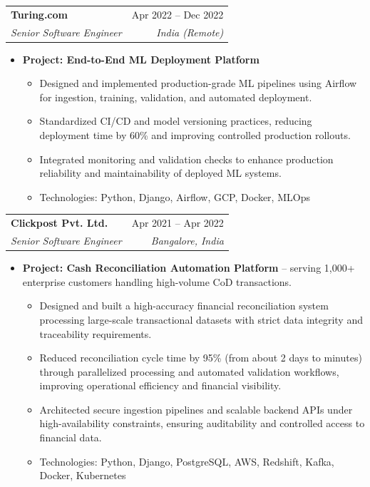 \documentclass[letterpaper,10pt]{article}
\makeatletter
\newcommand{\resumeItem}[1]{\item\small{#1}}
\newcommand{\resumeSubheading}[4]{
\vspace{-1pt}\item
  \begin{tabular*}{0.97\textwidth}[t]{l@{\extracolsep{\fill}}r}
    \textbf{#1} & #2 \\
    \textit{#3} & \textit{#4} \\
  \end{tabular*}\vspace{-7pt}
}
\newcommand{\resumeSubHeadingList}{\begin{itemize}[leftmargin=0.15in, label={}]}
\newcommand{\resumeSubHeadingListEnd}{\end{itemize}}
\makeatother
\begin{document}
  \resumeSubheading
      {Turing.com}{Apr 2022 -- Dec 2022}
      {Senior Software Engineer}{India (Remote)}
      \resumeSubHeadingList
          \resumeItem{\textbf{Project: End-to-End ML Deployment Platform}}
          \begin{itemize}[leftmargin=1.4em,label=•]
              \item \small{Designed and implemented production-grade ML pipelines using Airflow for ingestion, training, validation, and automated deployment.}
              \item \small{Standardized CI/CD and model versioning practices, reducing deployment time by 60\% and improving controlled production rollouts.}
              \item \small{Integrated monitoring and validation checks to enhance production reliability and maintainability of deployed ML systems.}
              \item \small{Technologies: Python, Django, Airflow, GCP, Docker, MLOps}
          \end{itemize}
      \resumeSubHeadingListEnd

  \resumeSubheading
      {Clickpost Pvt. Ltd.}{Apr 2021 -- Apr 2022}
      {Senior Software Engineer}{Bangalore, India}
      \resumeSubHeadingList
          \resumeItem{\textbf{Project: Cash Reconciliation Automation Platform} -- serving 1,000+ enterprise customers handling high-volume CoD transactions.}
          \begin{itemize}[leftmargin=1.4em,label=•]
              \item \small{Designed and built a high-accuracy financial reconciliation system processing large-scale transactional datasets with strict data integrity and traceability requirements.}
              \item \small{Reduced reconciliation cycle time by 95\% (from about 2 days to minutes) through parallelized processing and automated validation workflows, improving operational efficiency and financial visibility.}
              \item \small{Architected secure ingestion pipelines and scalable backend APIs under high-availability constraints, ensuring auditability and controlled access to financial data.}
              \item \small{Technologies: Python, Django, PostgreSQL, AWS, Redshift, Kafka, Docker, Kubernetes}
          \end{itemize}
      \resumeSubHeadingListEnd
\end{document}
